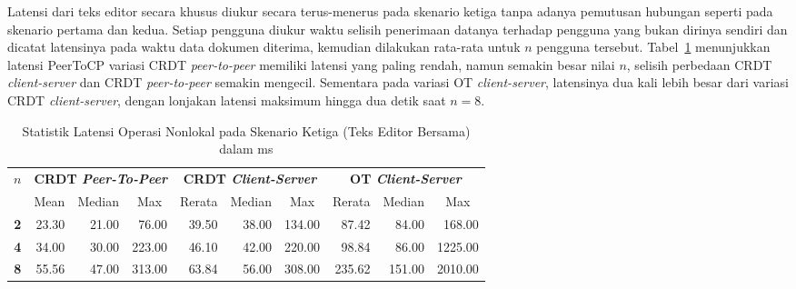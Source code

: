 Latensi dari teks editor secara khusus diukur secara terus-menerus pada skenario ketiga tanpa adanya pemutusan hubungan seperti pada skenario pertama dan kedua. Setiap pengguna diukur waktu selisih penerimaan datanya terhadap pengguna yang bukan dirinya sendiri dan dicatat latensinya pada waktu data dokumen diterima, kemudian dilakukan rata-rata untuk $n$ pengguna tersebut. Tabel~\ref{tab:latency-3} menunjukkan latensi PeerToCP variasi CRDT \textit{peer-to-peer} memiliki latensi yang paling rendah, namun semakin besar nilai $n$, selisih perbedaan CRDT \textit{client-server} dan CRDT \textit{peer-to-peer} semakin mengecil. Sementara pada variasi OT \textit{client-server}, latensinya dua kali lebih besar dari variasi CRDT \textit{client-server}, dengan lonjakan latensi maksimum hingga dua detik saat $n = 8$.

\begin{table}[H]
 \centering
\begin{tabular}{|c|rrr|rrr|rrr|}
\hline
\multirow{2}{*}{$n$} & \multicolumn{3}{c|}{\textbf{CRDT \textit{Peer-To-Peer}}} & \multicolumn{3}{c|}{\textbf{CRDT \textit{Client-Server}}} & \multicolumn{3}{c|}{\textbf{OT \textit{Client-Server}}} \\ \cline{2-10}
 & \multicolumn{1}{c|}{Mean} & \multicolumn{1}{c|}{Median} & \multicolumn{1}{c|}{Max} & \multicolumn{1}{c|}{Rerata} & \multicolumn{1}{c|}{Median} & \multicolumn{1}{c|}{Max} & \multicolumn{1}{c|}{Rerata} & \multicolumn{1}{c|}{Median} & \multicolumn{1}{c|}{Max} \\ \hline
\textbf{2} & \multicolumn{1}{r|}{23.30} & \multicolumn{1}{r|}{21.00} & 76.00 & \multicolumn{1}{r|}{39.50} & \multicolumn{1}{r|}{38.00} & 134.00 & \multicolumn{1}{r|}{87.42} & \multicolumn{1}{r|}{84.00} & 168.00 \\ \hline
\textbf{4} & \multicolumn{1}{r|}{34.00} & \multicolumn{1}{r|}{30.00} & 223.00 & \multicolumn{1}{r|}{46.10} & \multicolumn{1}{r|}{42.00} & 220.00 & \multicolumn{1}{r|}{98.84} & \multicolumn{1}{r|}{86.00} & 1225.00 \\ \hline
\textbf{8} & \multicolumn{1}{r|}{55.56} & \multicolumn{1}{r|}{47.00} & 313.00 & \multicolumn{1}{r|}{63.84} & \multicolumn{1}{r|}{56.00} & 308.00 & \multicolumn{1}{r|}{235.62} & \multicolumn{1}{r|}{151.00} & 2010.00 \\ \hline
\end{tabular}
 \caption{Statistik Latensi Operasi Nonlokal pada Skenario Ketiga (Teks Editor Bersama) dalam ms}
 \label{tab:latency-3}
\end{table}

